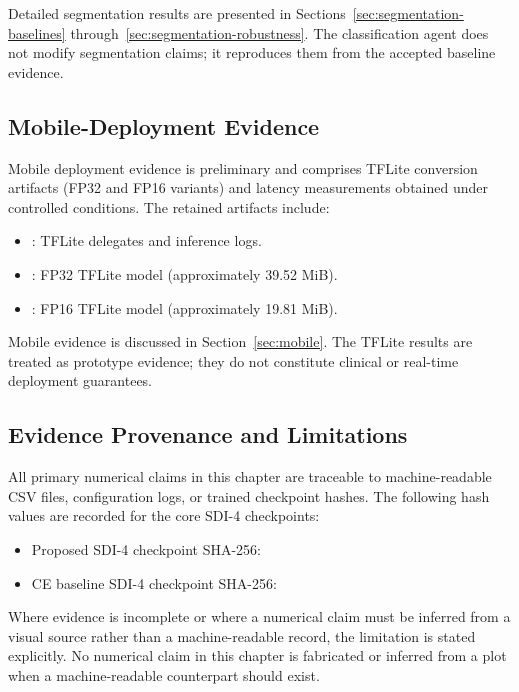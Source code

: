 Detailed segmentation results are presented in Sections~\ref{sec:segmentation-baselines} through~\ref{sec:segmentation-robustness}. The classification agent does not modify segmentation claims; it reproduces them from the accepted baseline evidence.

\subsection{Mobile-Deployment Evidence}
\label{sec:evidence-mobile}

Mobile deployment evidence is preliminary and comprises TFLite conversion artifacts (FP32 and FP16 variants) and latency measurements obtained under controlled conditions. The retained artifacts include:

\begin{itemize}
    \item {}: TFLite delegates and inference logs.
    \item {}: FP32 TFLite model (approximately 39.52 MiB).
    \item {}: FP16 TFLite model (approximately 19.81 MiB).
\end{itemize}

Mobile evidence is discussed in Section~\ref{sec:mobile}. The TFLite results are treated as prototype evidence; they do not constitute clinical or real-time deployment guarantees.

\subsection{Evidence Provenance and Limitations}
\label{sec:evidence-provenance}

All primary numerical claims in this chapter are traceable to machine-readable CSV files, configuration logs, or trained checkpoint hashes. The following hash values are recorded for the core SDI-4 checkpoints:

\begin{itemize}
    \item Proposed SDI-4 checkpoint SHA-256: 
    \item CE baseline SDI-4 checkpoint SHA-256: 
\end{itemize}

Where evidence is incomplete or where a numerical claim must be inferred from a visual source rather than a machine-readable record, the limitation is stated explicitly. No numerical claim in this chapter is fabricated or inferred from a plot when a machine-readable counterpart should exist.